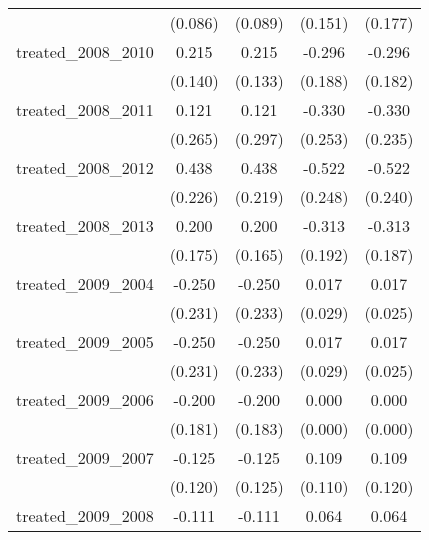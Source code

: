 {\begin{tabular}{l*{4}{c}}
            &     (0.086)         &     (0.089)         &     (0.151)         &     (0.177)         \\
[1em]
treated\_2008\_2010&       0.215         &       0.215         &      -0.296         &      -0.296         \\
            &     (0.140)         &     (0.133)         &     (0.188)         &     (0.182)         \\
[1em]
treated\_2008\_2011&       0.121         &       0.121         &      -0.330         &      -0.330         \\
            &     (0.265)         &     (0.297)         &     (0.253)         &     (0.235)         \\
[1em]
treated\_2008\_2012&       0.438         &       0.438\sym{*}  &      -0.522\sym{*}  &      -0.522\sym{*}  \\
            &     (0.226)         &     (0.219)         &     (0.248)         &     (0.240)         \\
[1em]
treated\_2008\_2013&       0.200         &       0.200         &      -0.313         &      -0.313         \\
            &     (0.175)         &     (0.165)         &     (0.192)         &     (0.187)         \\
[1em]
treated\_2009\_2004&      -0.250         &      -0.250         &       0.017         &       0.017         \\
            &     (0.231)         &     (0.233)         &     (0.029)         &     (0.025)         \\
[1em]
treated\_2009\_2005&      -0.250         &      -0.250         &       0.017         &       0.017         \\
            &     (0.231)         &     (0.233)         &     (0.029)         &     (0.025)         \\
[1em]
treated\_2009\_2006&      -0.200         &      -0.200         &       0.000         &       0.000         \\
            &     (0.181)         &     (0.183)         &     (0.000)         &     (0.000)         \\
[1em]
treated\_2009\_2007&      -0.125         &      -0.125         &       0.109         &       0.109         \\
            &     (0.120)         &     (0.125)         &     (0.110)         &     (0.120)         \\
[1em]
treated\_2009\_2008&      -0.111         &      -0.111         &       0.064         &       0.064         \\

\end{tabular}}
